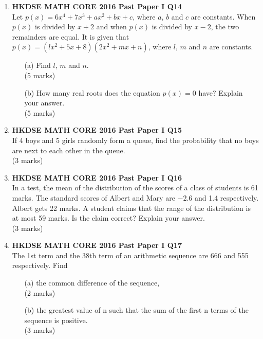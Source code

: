 \documentclass[12pt]{article}
\begin{document}
\begin{enumerate}
	\item \textbf{HKDSE MATH CORE 2016 Past Paper I Q14}\\
	Let $p(x) = 6x^4 + 7x^3 + ax^2 + bx + c$, where $a$, $b$ and $c$ are constants. When $p(x)$ is divided by $x + 2$ and when $p(x)$ is divided by $x - 2$, the two remainders are equal. It is given that $p(x) = (lx^2 + 5x + 8)(2x^2 + mx + n)$, where $l$, $m$ and $n$ are constants.
	\begin{enumerate}
		\item[(a)] Find $l$, $m$ and $n$. \\(5 marks)
		\item[(b)] How many real roots does the equation $p(x) = 0$ have? Explain your answer. \\(5 marks)
	\end{enumerate}

	\item \textbf{HKDSE MATH CORE 2016 Past Paper I Q15}\\
	If 4 boys and 5 girls randomly form a queue, find the probability that no boys are next to each other in the queue. \\(3 marks)

	\item \textbf{HKDSE MATH CORE 2016 Past Paper I Q16}\\
	In a test, the mean of the distribution of the scores of a class of students is 61 marks. The standard scores of Albert and Mary are $-2.6$ and 1.4 respectively. Albert gets 22 marks. A student claims that the range of the distribution is at most 59 marks. Is the claim correct? Explain your answer. \\(3 marks)

	\item \textbf{HKDSE MATH CORE 2016 Past Paper I Q17}\\
	The 1st term and the 38th term of an arithmetic sequence are 666 and 555 respectively. Find
	\begin{enumerate}
		\item[(a)] the common difference of the sequence, \\(2 marks)
		\item[(b)] the greatest value of n such that the sum of the first n terms of the sequence is positive. \\(3 marks)
	\end{enumerate}


\end{enumerate}
\end{document}
